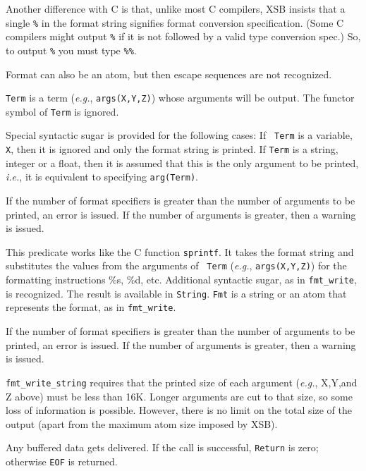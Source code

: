 \begin{description}
    Another difference with C is that, unlike most C compilers, XSB insists
    that a single {\tt \%} in the format string signifies format conversion
    specification. (Some C compilers might output {\tt \%} if it is not
    followed by a valid type conversion spec.) So, to output {\tt \%}
    you must type {\tt \%\%}.
    
    Format can also be an atom, but then escape sequences are not
    recognized.

    {\tt Term} is a term ({\it e.g.}, {\tt args(X,Y,Z)}) whose arguments
    will be output. The functor symbol of {\tt Term} is ignored.
    
    Special syntactic sugar is provided for the following cases: If {\tt
      Term} is a variable, {\tt X}, then it is ignored and only the format
    string is printed. If {\tt Term} is a string, integer or a float, then
    it is assumed that this is the only argument to be printed, {\it i.e.},
    it is equivalent to specifying {\tt arg(Term)}.

    If the number of format specifiers is greater than the number of
    arguments to be printed, an error is issued. If the number of arguments
    is greater, then a warning is issued.

    This predicate works like the C function {\tt sprintf}. It takes the
    format string and substitutes the values from the arguments of {\tt
      Term} ({\it e.g.}, {\tt args(X,Y,Z)}) for the formatting instructions
    \%s, \%d, etc. Additional syntactic sugar, as in \verb|fmt_write|, is
    recognized. The result is available in {\tt String}. {\tt Fmt} is a
    string or an atom that represents the format, as in
    {\tt fmt\_write}.
    
    If the number of format specifiers is greater than the number of
    arguments to be printed, an error is issued. If the number of arguments
    is greater, then a warning is issued.

    {\tt fmt\_write\_string} requires that the printed size of each
    argument ({\it e.g.}, X,Y,and Z above) must be less than 16K. Longer
    arguments are cut to that size, so some loss of information is possible.
    However, there is no limit on the total size of the output (apart from
    the maximum atom size imposed by XSB).

    Any buffered data gets delivered. If the call is successful, {\tt Return}
    is zero; otherwise {\tt EOF} is returned.


\end{description}
